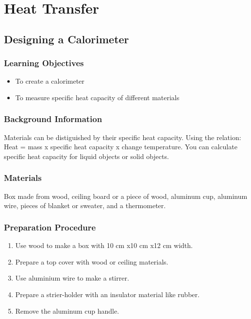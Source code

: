 \section{Heat Transfer}

\subsection{Designing a Calorimeter}

\subsubsection*{Learning Objectives}
\begin{itemize}
\item{To create a calorimeter}
\item{To measure specific heat capacity of different materials}
\end{itemize}

\subsubsection*{Background Information}
Materials can be distiguished by their specific heat capacity. Using the relation: Heat = mass x specific heat capacity x change temperature. You can calculate specific heat capacity for liquid objects or solid objects.

\subsubsection*{Materials}
Box made from wood, ceiling board or a piece of wood, aluminum cup, aluminum wire, pieces of blanket or sweater, and a thermometer.

\subsubsection*{Preparation Procedure}
\begin{enumerate}
\item{Use wood to make a box with 10 cm x10 cm x12 cm width.}
\item{Prepare a top cover with wood or ceiling materials.}
\item{Use aluminium wire to make a stirrer.}
\item{Prepare a strier-holder with an insulator material like rubber.}
\item{Remove the aluminum cup handle.}
\end{enumerate}

